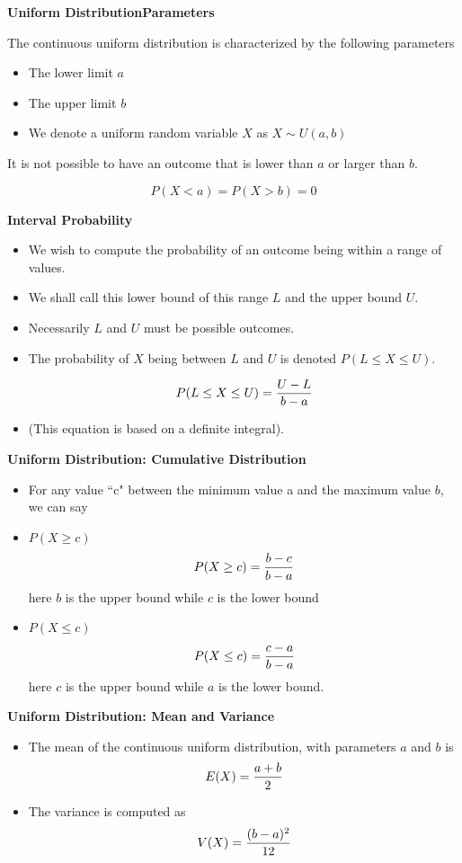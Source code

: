 {
\textbf{Uniform DistributionParameters}


The continuous uniform distribution is characterized by the following parameters

\begin{itemize}
\item The lower limit $a$
\item The upper limit $b$
\item We denote a uniform random variable $X$ as $X \sim U(a,b)$
\end{itemize}

It is not possible to have an outcome that is lower than $a$ or larger than $b$.

\[ P(X < a) = P(X > b) = 0\]
}

{\textbf{Interval Probability}

\begin{itemize}
\item We wish to compute the probability of an outcome being within a range of values.
\item We shall call this lower bound of this range $L$ and the upper bound $ U$.
\item Necessarily $L$ and $U$ must be possible outcomes.
\item The probability of $X$ being between $L$ and $U$ is denoted $P( L \leq X \leq U )$.

\[
P( L \leq X \leq U ) = { U - L \over b - a}
\]
\item (This equation is based on a definite integral).
\end{itemize}
}
{
\textbf{Uniform Distribution: Cumulative Distribution}
\begin{itemize}

\item For any value ``c" between the minimum value a and the maximum
value $b$, we can say
\item $P(X \geq c)$ \[P(X \geq c) = {b-c \over b-a}\]
here $b$ is the upper bound while $c$ is the lower bound
\item $P(X \leq c)$ \[P(X \leq c) = {c-a \over b-a}\]
here $c$ is the upper bound while $a$ is the lower bound.
\end{itemize}
}

{
\textbf{Uniform Distribution: Mean and Variance}
\begin{itemize}
\item The mean of the continuous uniform distribution, with parameters $a$ and $b$ is
\[ E(X) = {a+b \over 2}\]
\item The variance is computed as
\[ V(X) = {(b-a)^2 \over 12}\]
\end{itemize}
}
